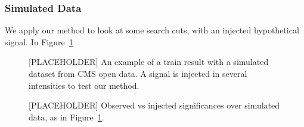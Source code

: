 \documentclass[../../ddppaper2.tex]{subfiles}
\begin{document}
\subsubsection{Simulated Data}

We apply our method to look at some search cuts, with an injected hypothetical signal. In Figure~\ref{fig:cms_open_data_train}

\begin{figure}
    \centering
    \placeholdergraphic
    \caption{[PLACEHOLDER] An example of a train result with a simulated dataset from CMS open data. A signal is injected in several intensities to test our method.}
    \label{fig:cms_open_data_train}
\end{figure}

\begin{figure}
    \centering
    \placeholdergraphic
    \caption{[PLACEHOLDER] Observed vs injected significances over simulated data, as in Figure~\ref{fig:cms_open_data_train}.}
    \label{fig:cms_open_data_significances}
\end{figure}
\end{document}
